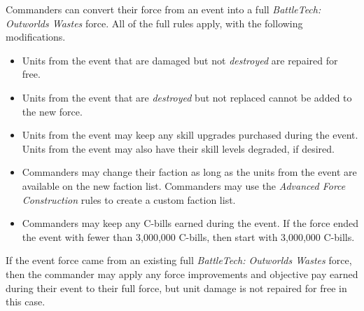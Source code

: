 Commanders can convert their force from an event into a full \emph{BattleTech: Outworlds Wastes} force.
All of the full  rules apply, with the following modifications.

\begin{itemize}

\item Units from the event that are damaged but not \emph{destroyed} are repaired for free.

\item Units from the event that are \emph{destroyed} but not replaced cannot be added to the new force.

\item Units from the event may keep any skill upgrades purchased during the event.
Units from the event may also have their skill levels degraded, if desired.

\item Commanders may change their faction as long as the units from the event are available on the new faction list.
Commanders may use the \emph{Advanced Force Construction} rules to create a custom faction list.

\item Commanders may keep any C-bills earned during the event.
If the force ended the event with fewer than 3,000,000 C-bills, then start with 3,000,000 C-bills.

\end{itemize}

If the event force came from an existing full \emph{BattleTech: Outworlds Wastes} force, then the commander may apply any force improvements and objective pay earned during their event to their full force, but unit damage is not repaired for free in this case.

